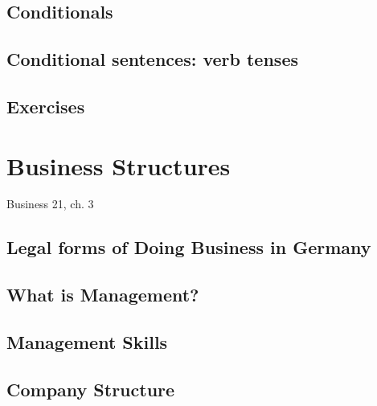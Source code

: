 \subsection{Conditionals}

\subsection{Conditional sentences: verb tenses}

\subsection{Exercises}



\section{Business Structures}
Business 21, ch. 3
\subsection{Legal forms of Doing Business in Germany}



\subsection{What is Management?}
\subsection{Management Skills}
\subsection{Company Structure}
